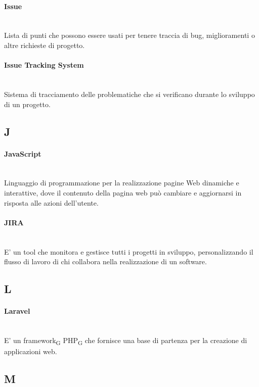 \paragraph{Issue}~\smallskip \\
Lista di punti che possono essere usati per tenere traccia di bug, miglioramenti o altre richieste di progetto.

\paragraph{Issue Tracking System}~\smallskip \\
Sistema di tracciamento delle problematiche che si verificano durante lo sviluppo di un progetto.
\newpage
{}
\subsection*{J}
\paragraph{JavaScript}~\smallskip \\
Linguaggio di programmazione per la realizzazione pagine Web dinamiche e interattive, dove il contenuto della pagina web può cambiare e aggiornarsi in risposta alle azioni dell'utente.

\paragraph{JIRA}~\smallskip \\
E' un tool che monitora e gestisce tutti i progetti in sviluppo, personalizzando il flusso di lavoro di chi collabora nella realizzazione di un software.

\newpage
{}
\subsection*{L}
\paragraph{Laravel}~\smallskip \\
E' un framework\textsubscript{G} PHP\textsubscript{G} che fornisce una base di partenza per la creazione di applicazioni web.

\newpage
{}
\subsection*{M}

